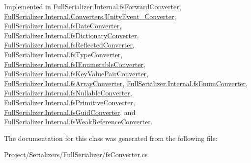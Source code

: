 Implemented in \hyperlink{class_full_serializer_1_1_internal_1_1fs_forward_converter_a252f2f0a0391e2099be798b1749a2582}{Full\+Serializer.\+Internal.\+fs\+Forward\+Converter}, \hyperlink{class_full_serializer_1_1_internal_1_1_converters_1_1_unity_event___converter_a98db577455b325edf5035170c6297474}{Full\+Serializer.\+Internal.\+Converters.\+Unity\+Event\+\_\+\+Converter}, \hyperlink{class_full_serializer_1_1_internal_1_1fs_date_converter_a4728edb68d03760970cb536f9c376cc0}{Full\+Serializer.\+Internal.\+fs\+Date\+Converter}, \hyperlink{class_full_serializer_1_1_internal_1_1fs_dictionary_converter_a00582c5fe666a61ae4d528848bdffbd7}{Full\+Serializer.\+Internal.\+fs\+Dictionary\+Converter}, \hyperlink{class_full_serializer_1_1_internal_1_1fs_reflected_converter_a36c564a35f373263c7da7c4de140ba0e}{Full\+Serializer.\+Internal.\+fs\+Reflected\+Converter}, \hyperlink{class_full_serializer_1_1_internal_1_1fs_type_converter_afbf95621a91efff18569544dee5134fe}{Full\+Serializer.\+Internal.\+fs\+Type\+Converter}, \hyperlink{class_full_serializer_1_1_internal_1_1fs_i_enumerable_converter_a10f24874fda7fcb99a6a8380127dc8d0}{Full\+Serializer.\+Internal.\+fs\+I\+Enumerable\+Converter}, \hyperlink{class_full_serializer_1_1_internal_1_1fs_key_value_pair_converter_acedb142bdabfb30c6cd43874734cbc33}{Full\+Serializer.\+Internal.\+fs\+Key\+Value\+Pair\+Converter}, \hyperlink{class_full_serializer_1_1_internal_1_1fs_array_converter_af02bc420e26cbf123cadecb15b06f1ed}{Full\+Serializer.\+Internal.\+fs\+Array\+Converter}, \hyperlink{class_full_serializer_1_1_internal_1_1fs_enum_converter_a93dc5222263e0354440a14a8dac74128}{Full\+Serializer.\+Internal.\+fs\+Enum\+Converter}, \hyperlink{class_full_serializer_1_1_internal_1_1fs_nullable_converter_aae7da556bba4e45495162611e24e8d68}{Full\+Serializer.\+Internal.\+fs\+Nullable\+Converter}, \hyperlink{class_full_serializer_1_1_internal_1_1fs_primitive_converter_a07017626af98ba7a48a3947b7d49a08c}{Full\+Serializer.\+Internal.\+fs\+Primitive\+Converter}, \hyperlink{class_full_serializer_1_1_internal_1_1fs_guid_converter_af5e30658913957e51c7caa51622c2627}{Full\+Serializer.\+Internal.\+fs\+Guid\+Converter}, and \hyperlink{class_full_serializer_1_1_internal_1_1fs_weak_reference_converter_ac0c327bc319e20e3648e58239ac90888}{Full\+Serializer.\+Internal.\+fs\+Weak\+Reference\+Converter}.



The documentation for this class was generated from the following file\+:\begin{DoxyCompactItemize}
\item 
Project/\+Serializers/\+Full\+Serializer/fs\+Converter.\+cs\end{DoxyCompactItemize}
